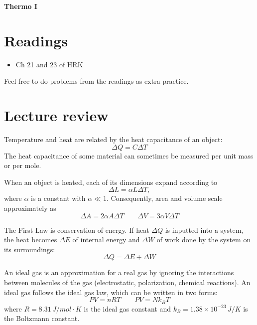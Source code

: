 \documentclass[11pt]{scrartcl}
\title{\titlee}
\author{Cambridge Physics Academy}
\date{2023-2024}
\newcommand{\titlee}{Thermo I}
\begin{document}
\thispagestyle{empty}
\begin{center}
    
    
    \Huge \textbf{\textsf{\titlee}}

    \large \theauthor
\end{center}

\setcounter{section}{-1}
\section{Readings}
\begin{itemize}
    \item Ch 21 and 23 of HRK
\end{itemize}
Feel free to do problems from the readings as extra practice.


\section{Lecture review}

\begin{defn}
    Temperature and heat are related by the heat capacitance of an object: $$\Delta Q=C\Delta T$$ The heat capacitance of some material can sometimes be measured per unit mass or per mole. 
\end{defn}

\begin{theorem}
    When an object is heated, each of its dimensions expand according to $$\Delta L=\alpha L\Delta T,$$ where $\alpha$ is a constant with $\alpha \ll 1$. Consequently, area and volume scale approximately as $$\Delta A=2\alpha A\Delta T\qquad \Delta V=3\alpha V\Delta T$$
\end{theorem}

\begin{defn}
    The First Law is conservation of energy. If heat $\Delta Q$ is inputted into a system, the heat becomes $\Delta E$ of internal energy and $\Delta W$ of work done by the system on its surroundings: $$\Delta Q=\Delta E+\Delta W$$
\end{defn}

\begin{defn}
    An ideal gas is an approximation for a real gas by ignoring the interactions between molecules of the gas (electrostatic, polarization, chemical reactions). An ideal gas follows the ideal gas law, which can be written in two forms: $$PV=nRT\qquad PV=Nk_BT$$ where $R=8.31\, \unit{J/mol\cdot K}$ is the ideal gas constant and $k_B=1.38\times 10^{-23}\, \unit{J/K}$ is the Boltzmann constant. 
\end{defn}
\end{document}
